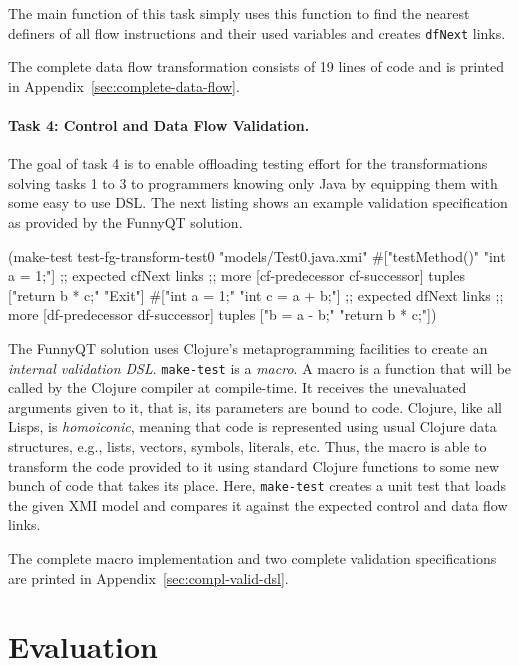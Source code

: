 \documentclass[submission]{eptcs}
\begin{document}
The main function of this task simply uses this function to find the nearest
definers of all flow instructions and their used variables and creates
\verb|dfNext| links.

The complete data flow transformation consists of 19 lines of code and is
printed in Appendix~\ref{sec:complete-data-flow}.


\paragraph{Task 4: Control and Data Flow Validation.}
\label{sec:task-4}

The goal of task 4 is to enable offloading testing effort for the
transformations solving tasks 1 to 3 to programmers knowing only Java by
equipping them with some easy to use DSL.  The next listing shows an example
validation specification as provided by the FunnyQT solution.

\begin{clojurecode}
(make-test test-fg-transform-test0 "models/Test0.java.xmi"
           #{["testMethod()"   "int a = 1;"]     ;; expected cfNext links
             ;; more [cf-predecessor cf-successor] tuples
             ["return b * c;"  "Exit"]}
           #{["int a = 1;"     "int c = a + b;"] ;; expected dfNext links
             ;; more [df-predecessor df-successor] tuples
             ["b = a - b;"     "return b * c;"]})
\end{clojurecode}

The FunnyQT solution uses Clojure's metaprogramming facilities to create an
\emph{internal validation DSL}.  \verb|make-test| is a \emph{macro}.  A macro
is a function that will be called by the Clojure compiler at compile-time.  It
receives the unevaluated arguments given to it, that is, its parameters are
bound to code.  Clojure, like all Lisps, is \emph{homoiconic}, meaning that
code is represented using usual Clojure data structures, e.g., lists, vectors,
symbols, literals, etc.  Thus, the macro is able to transform the code provided
to it using standard Clojure functions to some new bunch of code that takes its
place.  Here, \verb|make-test| creates a unit test that loads the given XMI
model and compares it against the expected control and data flow links.

The complete macro implementation and two complete validation specifications
are printed in Appendix~\ref{sec:compl-valid-dsl}.


\section{Evaluation}
\label{sec:evaluation}
\end{document}
